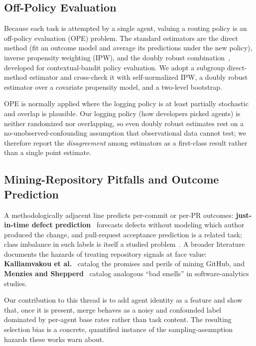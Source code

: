 \subsection{Off-Policy Evaluation}

Because each task is attempted by a single agent, valuing a routing policy is an off-policy evaluation (OPE) problem. The standard estimators are the direct method (fit an outcome model and average its predictions under the new policy), inverse propensity weighting (IPW), and the doubly robust combination~\cite{dudik2011doubly}, developed for contextual-bandit policy evaluation. We adopt a subgroup direct-method estimator and cross-check it with self-normalized IPW, a doubly robust estimator over a covariate propensity model, and a two-level bootstrap.

OPE is normally applied where the logging policy is at least partially stochastic and overlap is plausible. Our logging policy (how developers picked agents) is neither randomized nor overlapping, so even doubly robust estimates rest on a no-unobserved-confounding assumption that observational data cannot test; we therefore report the \emph{disagreement} among estimators as a first-class result rather than a single point estimate.

\subsection{Mining-Repository Pitfalls and Outcome Prediction}

A methodologically adjacent line predicts per-commit or per-PR outcomes: \textbf{just-in-time defect prediction}~\cite{ni2024jit} forecasts defects without modeling which author produced the change, and pull-request acceptance prediction is a related task; class imbalance in such labels is itself a studied problem~\cite{hegarcia2009imbalanced}. A broader literature documents the hazards of treating repository signals at face value: \textbf{Kalliamvakou et al.}~\cite{kalliamvakou2016promises} catalog the promises and perils of mining GitHub, and \textbf{Menzies and Shepperd}~\cite{menzies2019badsmells} catalog analogous ``bad smells'' in software-analytics studies.

Our contribution to this thread is to add agent identity as a feature and show that, once it is present, merge behaves as a noisy and confounded label dominated by per-agent base rates rather than task content. The resulting selection bias is a concrete, quantified instance of the sampling-assumption hazards these works warn about.

